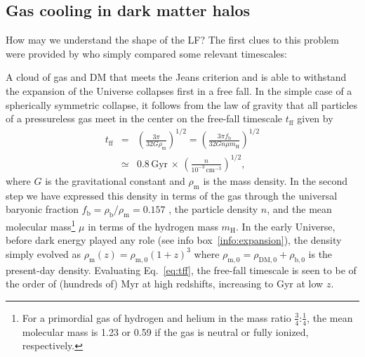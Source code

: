 \documentclass[useAMS]{aa}
\begin{document}
\subsection{Gas cooling in dark matter halos}
\label{sec:cooling}

How may we understand the shape of the LF? The first clues to this problem were provided by \citet{Rees1977} who simply compared some relevant timescales: 

A cloud of gas and DM that meets the Jeans criterion and is able to withstand the expansion of the Universe collapses first in a free fall.
In the simple case of a spherically symmetric collapse, it follows from the law of gravity that all particles of a pressureless gas meet in the center on the free-fall timescale $t_\mathrm{ff}$ given by
\begin{eqnarray}
    \label{eq:tff}
    t_\mathrm{ff} & = & \left( \frac{3\pi}{32 G \rho_\mathrm{m}} \right)^{1/2}
                    = \left( \frac{3\pi f_\mathrm{b}}{32 G n \mu m_\mathrm{H}} \right)^{1/2}\\
                  & \simeq & 0.8\,\mathrm{Gyr}\,\times\,\left(\frac{n}{10^{-3}\,\mathrm{cm}^{-3}}\right)^{1/2},
\end{eqnarray}
where
$G$ is the gravitational constant and $\rho_\mathrm{m}$ is the mass density.
In the second step we have expressed this density in terms of the gas through the universal baryonic fraction $f_\mathrm{b} = \rho_\mathrm{b}/\rho_\mathrm{m} = 0.157$ \citep{PlanckCollaboration2020}, the particle density $n$, and the mean molecular mass\footnote{For a primordial gas of hydrogen and helium in the mass ratio $\frac{3}{4}$:$\frac{1}{4}$, the mean molecular mass is 1.23 or 0.59 if the gas is neutral or fully ionized, respectively.} $\mu$ in terms of the hydrogen mass $m_\mathrm{H}$.
In the early Universe, before dark energy played any role (see info box~\ref{info:expansion}), the density simply evolved as $\rho_\mathrm{m}(z) = \rho_\mathrm{m,0} (1+z)^3$ where $\rho_\mathrm{m,0} = \rho_\mathrm{DM,0} + \rho_\mathrm{b,0}$ is the present-day density.
Evaluating Eq.~\ref{eq:tff}, the free-fall timescale is seen to be of the order of (hundreds of) Myr at high redshifts, increasing to Gyr at low $z$.
\end{document}
